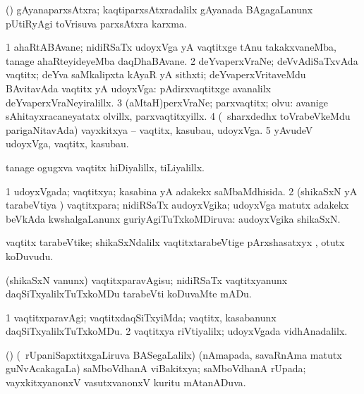 {{{{{{{{{{{{\bentry
{}
\gl{\nA}
\expl{}
\bmng
 (\saM) gAyanaparxsAtxra; kaqtiparxsAtxradalilx gAyanada BAgagaLanunx pUtiRyAgi toVrisuva parxsAtxra karxma. 
\emng
\eentry

\bentry
{} 
\gl{\nA}
\expl{}
\bmng
\bnum
\num{1} ahaRtABAvane; nidiRSaTx udoyxVga yA vaqtitxge tAnu takakxvaneMba, tanage ahaRteyideyeMba daqDhaBAvane. 
\num{2} deYvaperxVraNe; deVvAdiSaTxvAda vaqtitx; deYva saMkalipxta kAyaR yA sithxti; deYvaperxVritaveMdu BAvitavAda vaqtitx yA udoyxVga:  pAdirxvaqtitxge avanalilx deYvaperxVraNeyiralillx. 
\num{3} (aMtaH)perxVraNe; parxvaqtitx; olvu:  avanige sAhitayxracaneyatatx olvillx, parxvaqtitxyillx. 
\num{4} (\kanmu\ sharxdedhx toVrabeVkeMdu parigaNitavAda) vayxkitxya -- vaqtitx, kasubau, udoyxVga. 
\num{5} yAvudeV udoyxVga, vaqtitx, kasubau. 
\enum
\emng

\noindent 
\gl{\pagu}
\expl{}
\bmng
  tanage ogugxva vaqtitx hiDiyalillx, tiLiyalillx. 
\emng
\eentry

\bentry 
{} 
\gl{\gu}
\expl{}
\bmng
\bnum
\num{1} udoyxVgada; vaqtitxya; kasabina yA adakekx saMbaMdhisida. 
\num{2} (shikaSxN yA tarabeVtiya \vi) vaqtitxpara; nidiRSaTx audoyxVgika; udoyxVga matutx adakekx beVkAda kwshalgaLanunx guriyAgiTuTxkoMDiruva:  audoyxVgika shikaSxN. 
\enum
\emng
\eentry

\bentry
{} 
\gl{\sakirx}
\expl{}
\bmng
\emng
\eentry

\bentry 
{} 
\gl{\nA}
\expl{}
\bmng
 vaqtitx tarabeVtike; shikaSxNdalilx vaqtitxtarabeVtige pArxshasatxyx , otutx koDuvudu. 
\emng
\eentry

\bentry
{} 
\gl{\sakirx}
\expl{}
\bmng
 (shikaSxN \mo vanunx) vaqtitxparavAgisu; nidiRSaTx vaqtitxyanunx daqSiTxyalilxTuTxkoMDu tarabeVti koDuvaMte mADu. 
\emng
\eentry

\bentry
{} 
\gl{\kirxvi}
\expl{}
\bmng
\bnum
\num{1} vaqtitxparavAgi; vaqtitxdaqSiTxyiMda; vaqtitx, kasabanunx daqSiTxyalilxTuTxkoMDu. 
\num{2} vaqtitxya riVtiyalilx; udoyxVgada vidhAnadalilx. 
\enum
\emng
\eentry

\bentry
{} 
\gl{\gu}
\expl{}
\bmng
 (\vAyx) (\kanmu\ rUpaniSapxtitxgaLiruva BASegaLalilx) (nAmapada, savaRnAma matutx guNvAcakagaLa) saMboVdhanA viBakitxya; saMboVdhanA rUpada; vayxkitxyanonxV vasutxvanonxV kuritu mAtanADuva. 
\emng
\eentry

}}}}}}}}}}}}
